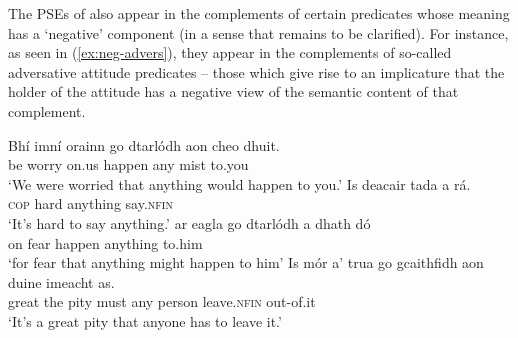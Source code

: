 \documentclass[output=paper,colorlinks,citecolor=brown]{langscibook}
\begin{document}


The PSEs of  also appear in the complements of certain predicates whose meaning has a `negative' component (in a sense that remains to be clarified). For instance, as seen in (\ref{ex:neg-advers}), they appear in the complements of so-called adversative attitude predicates -- those which give rise to an implicature that the holder of the attitude has a negative view of the semantic content of that complement.

\ea\label{ex:neg-advers}
\ea
\gll Bhí imní orainn go dtarlódh aon cheo dhuit. \\
    {be\past} worry on.us {\C} {happen\cond} any mist to.you \\
\glt `We were worried that anything would happen to you.'
\ex
\gll Is deacair tada {a rá.} \\
     {\scshape cop} hard anything {say.\textsc{nfin}} \\
\glt `It's hard to say anything.'
\ex
\gll ar eagla go dtarlódh {a dhath} dó \\
     on fear {\C} {happen\cond} {anything} to.him \\
\glt `for fear that anything might happen to him'
\ex
\gll Is mór a' trua go gcaithfidh aon duine imeacht as. \\
     {\cop} great the pity {\go} must any person {leave.\textsc{nfin}} out-of.it \\
\glt `It's a great pity that anyone has to leave it.'
\z
\z
\end{document}
